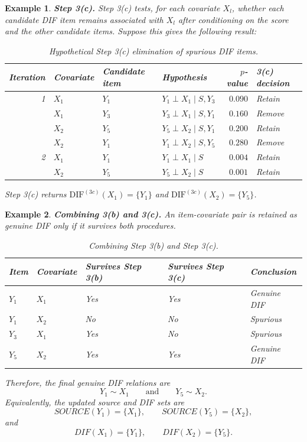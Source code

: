 \documentclass[12pt]{article}
\theoremstyle{examplestyle}
\newtheorem{example}{Example}[section]
\begin{document}
\begin{mybox3}
\begin{example}\label{ex:step3c} \textbf{Step 3(c).} 
Step 3(c) tests, for each covariate $X_l$, whether each candidate DIF item remains associated with $X_l$ after conditioning on the score and the other candidate items. Suppose this gives the following result:

\begin{table}[H]
\centering
\begin{tabular}{r l l l r l}
\hline
Iteration & Covariate & Candidate item & Hypothesis & $p$-value & 3(c) decision \\
\hline
1 & $X_1$ & $Y_1$ & $Y_1 \perp X_1 \mid S,Y_3$ & $0.090$ & Retain \\
  & $X_1$ & $Y_3$ & $Y_3 \perp X_1 \mid S,Y_1$ & $0.160$ & Remove \\
  & $X_2$ & $Y_5$ & $Y_5 \perp X_2 \mid S,Y_1$ & $0.200$ & Retain \\
  & $X_2$ & $Y_1$ & $Y_1 \perp X_2 \mid S,Y_5$ & $0.280$ & Remove \\
2 & $X_1$ & $Y_1$ & $Y_1 \perp X_1 \mid S$ & $0.004$ & Retain \\
  & $X_2$ & $Y_5$ & $Y_5 \perp X_2 \mid S$ & $0.001$ & Retain \\
\hline
\end{tabular}
\caption{Hypothetical Step 3(c) elimination of spurious DIF items.}
\label{tab:step3_example_3c}
\end{table}
Step 3(c) returns $\mathrm{DIF}^{(3c)}(X_1)=\{Y_1\}$ and $\mathrm{DIF}^{(3c)}(X_2)=\{Y_5\}$.

\end{example}
\end{mybox3}

\begin{mybox3}
\begin{example}\label{ex:step3b-and-c} \textbf{Combining 3(b) and 3(c).} An item-covariate pair is retained as genuine DIF only if it survives both procedures.

\begin{table}[H]
\centering
\begin{tabular}{l l l l l}
\hline
Item & Covariate & Survives Step 3(b) & Survives Step 3(c) & Conclusion \\
\hline
$Y_1$ & $X_1$ & Yes & Yes & Genuine DIF \\
$Y_1$ & $X_2$ & No & No & Spurious \\
$Y_3$ & $X_1$ & Yes & No & Spurious \\
$Y_5$ & $X_2$ & Yes & Yes & Genuine DIF \\
\hline
\end{tabular}
\caption{Combining Step 3(b) and Step 3(c).}
\label{tab:step3_example_combined}
\end{table}

Therefore, the final genuine DIF relations are
\[
Y_1 \sim X_1
\qquad \text{and} \qquad
Y_5 \sim X_2.
\]
Equivalently, the updated source and DIF sets are
\[
SOURCE(Y_1)=\{X_1\}, \qquad SOURCE(Y_5)=\{X_2\},
\]
and
\[
DIF(X_1)=\{Y_1\}, \qquad DIF(X_2)=\{Y_5\}.
\]
\end{example}
\end{mybox3}
\end{document}
